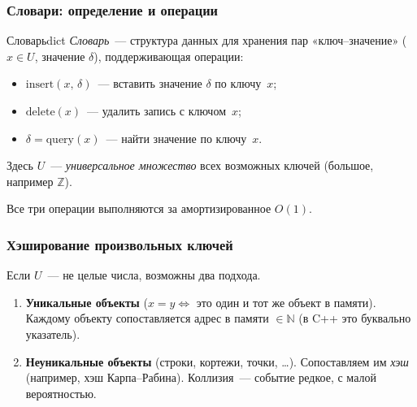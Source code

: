 \subsubsection*{Словари: определение и операции}

\begin{Definition}{Словарь}{dict}
	\emph{Словарь}~--- структура данных для хранения пар «ключ--значение»
	($x \in U$, значение $\delta$), поддерживающая операции:
	\begin{itemize}
		\item $\mathrm{insert}(x,\,\delta)$~--- вставить значение $\delta$ по ключу~$x$;
		\item $\mathrm{delete}(x)$~--- удалить запись с ключом~$x$;
		\item $\delta = \mathrm{query}(x)$~--- найти значение по ключу~$x$.
	\end{itemize}
	Здесь $U$~--- \emph{универсальное множество} всех возможных ключей (большое, например $\mathbb{Z}$).
\end{Definition}

Все три операции выполняются за амортизированное $O(1)$.

\subsubsection*{Хэширование произвольных ключей}

Если $U$~--- не целые числа, возможны два подхода.

\begin{enumerate}
	\item \textbf{Уникальные объекты}
	($x = y \Leftrightarrow$ это один и тот же объект в памяти).
	Каждому объекту сопоставляется адрес в памяти $\in \mathbb{N}$
	(в C++ это буквально указатель).
	
	\item \textbf{Неуникальные объекты} (строки, кортежи, точки, \ldots).
	Сопоставляем им \emph{хэш} (например, хэш Карпа--Рабина).
	Коллизия~--- событие редкое, с малой вероятностью.
\end{enumerate}